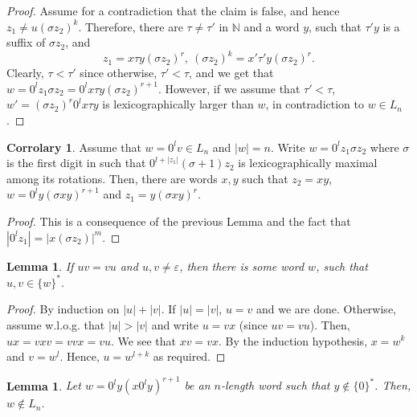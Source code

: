 \documentclass{article}
\newtheorem{lemma}[theorem]{Lemma}
\theoremstyle{definition}
\newtheorem{corrolary}[theorem]{Corrolary}
\newcommand{\N}{{\mathbb{N}}}
\begin{document}
\begin{proof}
	Assume for a contradiction that the claim is false, and hence $z_1\neq u(\sigma z_2)^k$. Therefore, there are $\tau\neq \tau'$ in $\N$ and a word $y$, such that $\tau'y$ is a suffix of $\sigma z_2$, and 
	$$z_1=x\tau y(\sigma z_2)^r, \ (\sigma z_2)^k= x'\tau' y(\sigma z_2)^r.$$
	Clearly, $\tau<\tau'$ since otherwise, $\tau'<\tau$, and we get that 
	$w=0^lz_1\sigma z_2=0^lx\tau y (\sigma z_2)^{r+1}$. However, if we assume that $\tau'<\tau$, $w'=(\sigma z_2)^r0^lx\tau y$ is lexicographically larger than $w$, in contradiction to $w\in L_n$.
\end{proof}

\begin{corrolary}
	\label{z1-suffix}
	Assume that $w=0^lv\in L_n$ and $|w|=n$. Write $w=0^lz_1\sigma z_2$ where $\sigma$ is the first digit in such that $0^{l+|z_1|}(\sigma+1)z_2$ is lexicographically maximal among its rotations. Then, there are words $x,y$ such that $z_2=xy$, $w=0^ly(\sigma xy)^{r+1}$ and $z_1=y(\sigma xy)^r$.
\end{corrolary}
\begin{proof}
	This is a consequence of the previous Lemma and the fact that $|0^lz_1|=|x(\sigma z_2)|^m$.
\end{proof}

\begin{lemma}
	\label{concatenation}
	If $uv=vu$ and $u,v\neq\varepsilon$, then there is some word $w$, such that $u,v\in\{w\}^*$.
\end{lemma}

\begin{proof}
	By induction on $|u|+|v|$. If $|u|=|v|$, $u=v$ and we are done. Otherwise, assume w.l.o.g. that $|u|>|v|$ and write $u=vx$ (since $uv=vu$). Then, $ux=vxv=vvx=vu$. We see that $xv=vx$. By the induction hypothesis, $x=w^k$ and $v=w^l$. Hence, $u=w^{l+k}$ as required.
\end{proof}

\begin{lemma}
	\label{not-in-Ln}
	Let $w=0^ly(x0^ly)^{r+1}$ be an $n$-length word such that $y\notin \{0\}^*$. Then, $w\notin L_n$.
\end{lemma}
\end{document}
